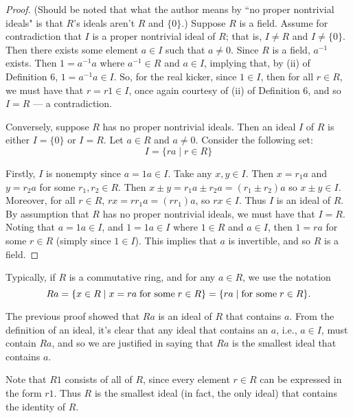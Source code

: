 \documentclass[graybox, reqno]{svmono}
\begin{document}
\begin{proof} (Should be noted that what the author means by ``no proper nontrivial ideals" is that $R$'s ideals aren't $R$ and $\{ 0 \}$.) Suppose $R$ is a field. Assume for contradiction that $I$ is a proper nontrivial ideal of $R$; that is, $I \neq R$ and $I \neq \{ 0 \}$. Then there exists some element $a \in I$ such that $a \neq 0$. Since $R$ is a field, $a^{-1}$ exists. Then $1 = a^{-1} a $ where $a^{-1} \in R$ and $a \in I$, implying that, by (ii) of Definition 6, $1 = a^{-1} a \in I$. So, for the real kicker, since $1 \in I$, then for all $r \in R$, we must have that $r = r 1 \in I$, once again courtesy of (ii) of Definition 6, and so $I = R$ --- a contradiction. 


Conversely, suppose $R$ has no proper nontrivial ideals. Then an ideal $I$ of $R$ is either $I = \{ 0 \}$ or $I =R$. Let $a \in R$ and $a \neq 0$. Consider the following set: \[ I= \{ ra \mid r \in R \} \]

Firstly, $I$ is nonempty since $a = 1 a \in I$. Take any $x, y \in I$. Then $x = r_1a$ and $y =r_2 a$ for some $r_1, r_2 \in R$. Then $x \pm y = r_1 a  \pm  r_2 a =  (r_1 \pm r_2) a $ so $x \pm y \in I$. Moreover, for all $r \in R$, $rx = rr_1 a = (rr_1) a$, so $rx \in I$. Thus $I$ is an ideal of $R$. By assumption that $R$ has no proper nontrivial ideals, we must have that $I = R $. Noting that $a = 1 a \in I$, and $1 = 1a \in I$ where $1 \in R$ and $a \in I$, then $1 = ra$ for some $r \in R$ (simply since $1 \in I$). This implies that $a$ is invertible, and so $R$ is a field.
\end{proof}

Typically, if $R$ is a commutative ring, and for any $a \in R$, we use the notation \[ Ra = \{ x \in R \mid x = ra \; \textup{for some} \; r \in R\} = \{ ra \mid  \textup{for some} \; r \in R \} .\]

The previous proof showed that $Ra$ is an ideal of $R$ that contains $a$. From the definition of an ideal, it's clear that any ideal that contains an $a$, i.e., $a \in I$, must contain $Ra$, and so we are justified in saying that $Ra$ is the smallest ideal that contains $a$.

Note that $R1$ consists of all of $R$, since every element $r \in R$ can be expressed in the form $r1$. Thus $R$ is the smallest ideal (in fact, the only ideal) that contains the identity of $R$. 
\end{document}
